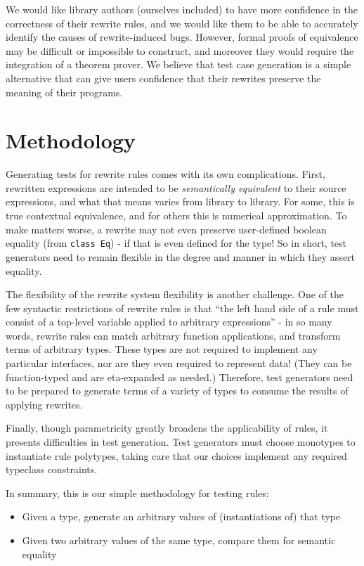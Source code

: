 \documentclass[format=sigconf, nonacm=true, review=true, screen=true]{acmart}
\begin{document}
We would like library authors (ourselves included) to have more confidence in the correctness of their rewrite rules, and we would like them to be able to accurately identify the causes of rewrite-induced bugs. However, formal proofs of equivalence may be difficult or impossible to construct, and moreover they would require the integration of a theorem prover. We believe that test case generation is a simple alternative that can give users confidence that their rewrites preserve the meaning of their programs.

\section{Methodology}

Generating tests for rewrite rules comes with its own complications. First, rewritten expressions are intended to be \textit{semantically equivalent} to their source expressions, and what that means varies from library to library. For some, this is true contextual equivalence, and for others this is numerical approximation. To make matters worse, a rewrite may not even preserve user-defined boolean equality (from \texttt{class Eq}) - if that is even defined for the type! So in short, test generators need to remain flexible in the degree and manner in which they assert equality.

The flexibility of the rewrite system flexibility is another challenge. One of the few syntactic restrictions of rewrite rules is that ``the left hand side of a rule must consist of a top-level variable applied to arbitrary expressions'' \cite{userguide} - in so many words, rewrite rules can match arbitrary function applications, and transform terms of arbitrary types. These types are not required to implement any particular interfaces, nor are they even required to represent data! (They can be function-typed and are eta-expanded as needed.) Therefore, test generators need to be prepared to generate terms of a variety of types to consume the results of applying rewrites.

Finally, though parametricity greatly broadens the applicability of rules, it presents difficulties in test generation. Test generators must choose monotypes to instantiate rule polytypes, taking care that our choices implement any required typeclass constraints.

In summary, this is our simple methodology for testing rules:

\begin{itemize}
  \item Given a type, generate an arbitrary values of (instantiations of) that type
  \item Given two arbitrary values of the same type, compare them for semantic equality
\end{itemize}
\end{document}
